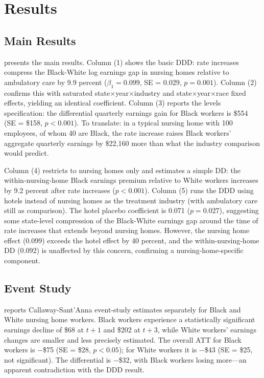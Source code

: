 \documentclass[12pt]{article}
\begin{document}
\section{Results}

\subsection{Main Results}

 presents the main results. Column (1) shows the basic DDD: rate increases compress the Black-White log earnings gap in nursing homes relative to ambulatory care by 9.9 percent ($\beta_1 = 0.099$, SE = 0.029, $p = 0.001$). Column (2) confirms this with saturated state$\times$year$\times$industry and state$\times$year$\times$race fixed effects, yielding an identical coefficient. Column (3) reports the levels specification: the differential quarterly earnings gain for Black workers is \$554 (SE = \$158, $p < 0.001$). To translate: in a typical nursing home with 100 employees, of whom 40 are Black, the rate increase raises Black workers' aggregate quarterly earnings by \$22,160 more than what the industry comparison would predict.

Column (4) restricts to nursing homes only and estimates a simple DD: the within-nursing-home Black earnings premium relative to White workers increases by 9.2 percent after rate increases ($p < 0.001$). Column (5) runs the DDD using hotels instead of nursing homes as the treatment industry (with ambulatory care still as comparison). The hotel placebo coefficient is 0.071 ($p = 0.027$), suggesting some state-level compression of the Black-White earnings gap around the time of rate increases that extends beyond nursing homes. However, the nursing home effect (0.099) exceeds the hotel effect by 40 percent, and the within-nursing-home DD (0.092) is unaffected by this concern, confirming a nursing-home-specific component.



\subsection{Event Study}

 reports Callaway-Sant'Anna event-study estimates separately for Black and White nursing home workers. Black workers experience a statistically significant earnings decline of \$68 at $t+1$ and \$202 at $t+3$, while White workers' earnings changes are smaller and less precisely estimated. The overall ATT for Black workers is $-$\$75 (SE = \$28, $p < 0.05$); for White workers it is $-$\$43 (SE = \$25, not significant). The differential is $-$\$32, with Black workers losing more---an apparent contradiction with the DDD result.
\end{document}

